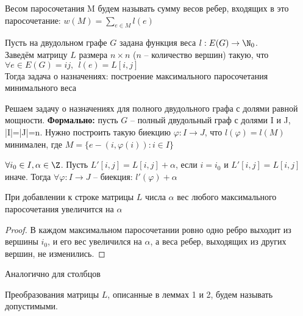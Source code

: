 	\begin{Def} 
		Весом паросочетания M будем называть сумму весов ребер, входящих в это паросочетание:
		$w(M) = \sum_{e \in M} l(e)$
	\end{Def} 

	\begin{Thm}
		Пусть на двудольном графе $G$ задана функция веса $l: E(G) \to \N_0$.\\
		Заведём матрицу $L$ размера $n \times n$ ($n$ -- количество вершин) такую, что 
		$\forall e \in E(G) = ij, \ \ l(e) = L[i,j]$\\
		Тогда задача о назначениях: построение максимального паросочетания минимального веса
	\end{Thm}
	
	\begin{Rem}
		Решаем задачу о назначениях для полного двудольного графа с долями равной мощности. 
		\textbf{Формально:} пусть $G$ -- полный двудольный граф с долями I и J, 
		|I|=|J|=n. Нужно построить такую биекцию $\varphi: I \to J$, что $l(\varphi) = l(M)$ минимален,
		где $M = \{e - (i, \varphi(i)): i \in I\}$  
	\end{Rem}


	\begin{Lm}
		$\forall i_0 \in I, \alpha \in \Z$. Пусть $L'[i,j] = L[i,j] + \alpha$, если $i = i_0$ и
		$L'[i,j] = L[i,j]$ иначе. Тогда $\forall \varphi: I \to J$ -- биекция: $l'(\varphi) + \alpha$
	\end{Lm}

	\begin{Rem}
		При добавлении к строке матрицы $L$ числа $\alpha$ вес любого максимального паросочетания
		увеличится на $\alpha$ 
	\end{Rem}

	\begin{proof}
		В каждом максимальном паросочетании ровно одно ребро выходит из вершины $i_0$, и его вес 
		увеличился на $\alpha$, а веса ребер, выходящих из других вершин, не изменились. 
	\end{proof}

	\begin{Lm}
		Аналогично для столбцов
	\end{Lm}

	\begin{Def}
		Преобразования матрицы $L$, описанные в леммах 1 и 2, будем называть допустимыми. 
	\end{Def}

